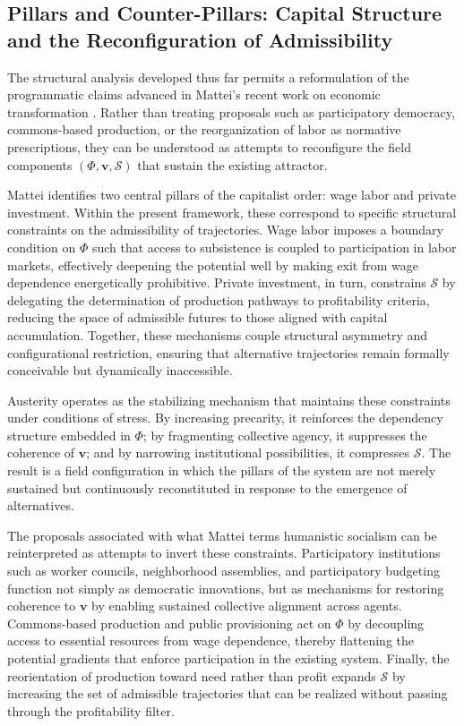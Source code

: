 \documentclass[11pt, a4paper]{article}
\begin{document}
\subsection{Pillars and Counter-Pillars: Capital Structure and the Reconfiguration of Admissibility}

The structural analysis developed thus far permits a reformulation of the programmatic claims advanced in Mattei's recent work on economic transformation \cite{mattei2026}. Rather than treating proposals such as participatory democracy, commons-based production, or the reorganization of labor as normative prescriptions, they can be understood as attempts to reconfigure the field components $(\Phi, \mathbf{v}, \mathcal{S})$ that sustain the existing attractor.

Mattei identifies two central pillars of the capitalist order: wage labor and private investment. Within the present framework, these correspond to specific structural constraints on the admissibility of trajectories. Wage labor imposes a boundary condition on $\Phi$ such that access to subsistence is coupled to participation in labor markets, effectively deepening the potential well by making exit from wage dependence energetically prohibitive. Private investment, in turn, constrains $\mathcal{S}$ by delegating the determination of production pathways to profitability criteria, reducing the space of admissible futures to those aligned with capital accumulation. Together, these mechanisms couple structural asymmetry and configurational restriction, ensuring that alternative trajectories remain formally conceivable but dynamically inaccessible.

Austerity operates as the stabilizing mechanism that maintains these constraints under conditions of stress. By increasing precarity, it reinforces the dependency structure embedded in $\Phi$; by fragmenting collective agency, it suppresses the coherence of $\mathbf{v}$; and by narrowing institutional possibilities, it compresses $\mathcal{S}$. The result is a field configuration in which the pillars of the system are not merely sustained but continuously reconstituted in response to the emergence of alternatives.

The proposals associated with what Mattei terms humanistic socialism can be reinterpreted as attempts to invert these constraints. Participatory institutions such as worker councils, neighborhood assemblies, and participatory budgeting function not simply as democratic innovations, but as mechanisms for restoring coherence to $\mathbf{v}$ by enabling sustained collective alignment across agents. Commons-based production and public provisioning act on $\Phi$ by decoupling access to essential resources from wage dependence, thereby flattening the potential gradients that enforce participation in the existing system. Finally, the reorientation of production toward need rather than profit expands $\mathcal{S}$ by increasing the set of admissible trajectories that can be realized without passing through the profitability filter.
\end{document}
